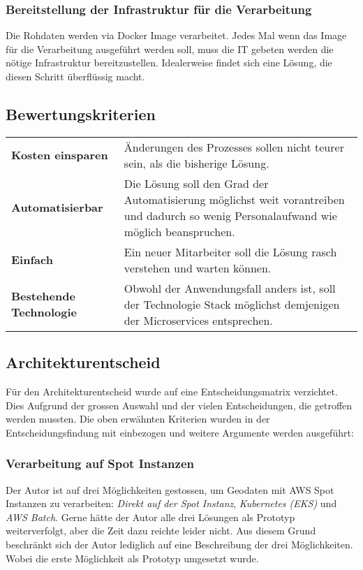 \subsubsection{Bereitstellung der Infrastruktur für die Verarbeitung}
Die Rohdaten werden via Docker Image verarbeitet. Jedes Mal wenn das Image für die Verarbeitung ausgeführt werden soll, muss die IT gebeten werden die nötige Infrastruktur bereitzustellen. Idealerweise findet sich eine Lösung, die diesen Schritt überflüssig macht.


\subsection{Bewertungskriterien}
\begin{tabular}{p{}p{}}
    \textbf{Kosten einsparen} & Änderungen des Prozesses sollen nicht teurer sein, als die bisherige Lösung.\\
    \textbf{Automatisierbar} & Die Lösung soll den Grad der Automatisierung möglichst weit vorantreiben und dadurch so wenig Personalaufwand wie möglich beanspruchen.\\
    \textbf{Einfach} & Ein neuer Mitarbeiter soll die Lösung rasch verstehen und warten können.\\
    \textbf{Bestehende Technologie} & Obwohl der Anwendungsfall anders ist, soll der Technologie Stack möglichst demjenigen der Microservices entsprechen.\\
\end{tabular}

\subsection{Architekturentscheid}
Für den Architekturentscheid wurde auf eine Entscheidungsmatrix verzichtet. Dies Aufgrund der grossen Auswahl und der vielen Entscheidungen, die getroffen werden mussten. Die oben erwähnten Kriterien wurden in der Entscheidungsfindung mit einbezogen und weitere Argumente werden ausgeführt:

\subsubsection{Verarbeitung auf Spot Instanzen}
Der Autor ist auf drei Möglichkeiten gestossen, um Geodaten mit AWS Spot Instanzen zu verarbeiten: \emph{Direkt auf der Spot Instanz}, \emph{Kubernetes (EKS)} und \emph{AWS Batch}. Gerne hätte der Autor alle drei Lösungen als Prototyp weiterverfolgt, aber die Zeit dazu reichte leider nicht. Aus diesem Grund beschränkt sich der Autor lediglich auf eine Beschreibung der drei Möglichkeiten. Wobei die erste Möglichkeit als Prototyp umgesetzt wurde.

